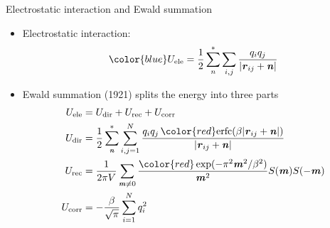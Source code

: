 \documentclass{beamer}
\newcommand{\redc}[1]{{\color{red} #1}}
\newcommand{\bluec}[1]{{\color{blue} #1}}
\renewcommand{\v}[1]{\textbf{\textit{#1}}}
\begin{document}
\begin{frame}{Electrostatic interaction and Ewald summation}
  \begin{itemize}
  \item<1->   Electrostatic interaction:
  \begin{equation*}\bluec{
    U_{\textrm{ele}} = \frac12 \sum^\ast_{n}\sum_{i,j}\frac{q_i q_j}{\vert \v r_{ij} + \v n\vert}}
  \end{equation*}
\item <2->
  Ewald summation (1921) splits the
  energy into three parts
  \bluec{
  \begin {align*}
    U_{\textrm{ele}} &=  U_{\textrm{dir}} + U_{\textrm{rec}}+ U_{\textrm{corr}}\\
    U_{\textrm{dir}} & = \frac12 \sum^{\ast}_{\v n}
    \sum_{i,j = 1}^{N} \frac{q_iq_j\, \redc{\textrm{erfc}(\beta \vert\v{r}_{ij} + \v{n}\vert)}}
    {\vert\v{r}_{ij} + \v{n}\vert} \\ \label{Erec-ewald}
    U_{\textrm{rec}} & = \frac1{2\pi V} \sum_{\v m \neq 0}
    \frac{\redc{\exp(-\pi^2\v m^2 / \beta^2)}}{\v m^2} S(\v m) S(-\v m) \\
    U_{\textrm{corr}}& = -\frac\beta{\sqrt \pi} \sum_{i=1}^N q_i^2
  \end {align*}}
  \end{itemize}
\end{frame}
\end{document}

